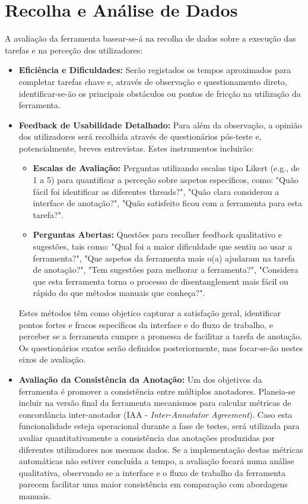 \section{Recolha e Análise de Dados}

A avaliação da ferramenta basear-se-á na recolha de dados sobre a execução das tarefas e na perceção dos utilizadores:

\begin{itemize}
    \item \textbf{Eficiência e Dificuldades:} Serão registados os tempos aproximados para completar tarefas chave e, através de observação e questionamento direto, identificar-se-ão os principais obstáculos ou pontos de fricção na utilização da ferramenta.
    \item \textbf{Feedback de Usabilidade Detalhado:} Para além da observação, a opinião dos utilizadores será recolhida através de questionários pós-teste e, potencialmente, breves entrevistas. Estes instrumentos incluirão:
        \begin{itemize}
            \item \textbf{Escalas de Avaliação:} Perguntas utilizando escalas tipo Likert (e.g., de 1 a 5) para quantificar a perceção sobre aspetos específicos, como: "Quão fácil foi identificar as diferentes threads?", "Quão clara considerou a interface de anotação?", "Quão satisfeito ficou com a ferramenta para esta tarefa?".
            \item \textbf{Perguntas Abertas:} Questões para recolher feedback qualitativo e sugestões, tais como: "Qual foi a maior dificuldade que sentiu ao usar a ferramenta?", "Que aspetos da ferramenta mais o(a) ajudaram na tarefa de anotação?", "Tem sugestões para melhorar a ferramenta?", "Considera que esta ferramenta torna o processo de disentanglement mais fácil ou rápido do que métodos manuais que conheça?".
        \end{itemize}
    Estes métodos têm como objetico capturar a satisfação geral, identificar pontos fortes e fracos específicos da interface e do fluxo de trabalho, e perceber se a ferramenta cumpre a promessa de facilitar a tarefa de anotação. Os questionários exatos serão definidos posteriormente, mas focar-se-ão nestes eixos de avaliação.
    \item \textbf{Avaliação da Consistência da Anotação:} Um dos objetivos da ferramenta é promover a consistência entre múltiplos anotadores. Planeia-se incluir na versão final da ferramenta mecanismos para calcular métricas de concordância inter-anotador (IAA - \textit{Inter-Annotator Agreement}). Caso esta funcionalidade esteja operacional durante a fase de testes, será utilizada para avaliar quantitativamente a consistência das anotações produzidas por diferentes utilizadores nos mesmos dados. Se a implementação destas métricas automáticas não estiver concluída a tempo, a avaliação focará numa análise qualitativa, observando se a interface e o fluxo de trabalho da ferramenta parecem facilitar uma maior consistência em comparação com abordagens manuais.
\end{itemize}

